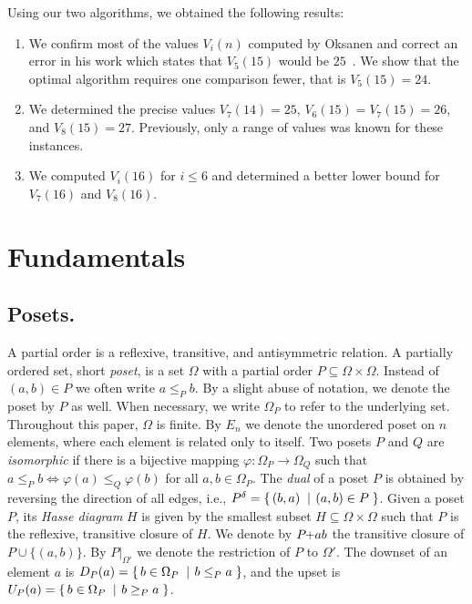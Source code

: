\documentclass[a4paper,UKenglish,cleveref, autoref, thm-restate]{lipics-v2021}
\makeatletter
\newcommand{\set}[2]{\left\{\, \mathinner{#1}\vphantom{#2}\: \left|\: \vphantom{#1}\mathinner{#2} \right.\,\right\}}
\newcommand\ie{i.e\@., }
\newcommand{\sse}{\subseteq}
\newcommand{\pchild}[3]{{#1}\kern-1pt{+}{#2}{#3}}
\newcommand{\dual}[1]{{#1}^{\delta}}
\newcommand{\less}[2]{D_{#1}(#2)}
\newcommand{\greater}[2]{U_{#1}(#2)}
\makeatother
\begin{document}
Using our two algorithms, we obtained the following results:
\begin{enumerate}
  \item We confirm most of the values $V_i(n)$ computed by Oksanen and correct an error in his work which states that $V_5(15)$ would be $25$~\cite{Oksanen}.
        We show that the optimal algorithm requires one comparison fewer, that is $V_5(15) = 24$.
  \item We determined the precise values $V_7(14) = 25$, $V_6(15) = V_7(15) = 26$, and $V_8(15) = 27$.
        Previously, only a range of values was known for these instances.
  \item We computed $V_i(16)$ for $i \leq 6$ and determined a better lower bound for $V_7(16)$ and $V_8(16)$.
\end{enumerate}


\section{Fundamentals}

\subsection{Posets.}
A partial order is a reflexive, transitive, and antisymmetric relation.
A partially ordered set, short \emph{poset}, is a set $\Omega$ with a partial order $P \subseteq \Omega \times \Omega$.
Instead of $(a, b) \in P$ we often write $a \le_P b$.
By a slight abuse of notation, we denote the poset by $P$ as well.
When necessary, we write $\Omega_P$ to refer to the underlying set.
Throughout this paper, $\Omega$ is finite.
By $E_n$ we denote the unordered poset on $n$ elements, where each element is related only to itself.
Two posets $P$ and $Q$ are \emph{isomorphic} if there is a bijective mapping $\varphi: \Omega_P \to \Omega_Q$ such that $a \le_P b \iff \varphi(a) \le_Q \varphi(b)$ for all $a, b \in \Omega_P$.
The \emph{dual} of a poset $P$ is obtained by reversing the direction of all edges, \ie $\dual{P} = \set{(b,a)}{(a,b) \in P}$.
Given a poset $P$, its \emph{Hasse diagram} $H$ is given by the smallest subset $H \sse \Omega \times \Omega$ such that $P$ is the reflexive, transitive closure of $H$.
We denote by $\pchild{P}{a}{b}$ the transitive closure of $P \cup \{(a, b)\}$.
By $P|_{\Omega'}$ we denote the restriction of $P$ to $\Omega'$.
The downset of an element $a$ is $\less{P}{a} = \set{b \in \Omega_P}{b \le_P a}$, and the upset is $\greater{P}{a} = \set{b \in \Omega_P}{b \ge_P a}$.
\end{document}
